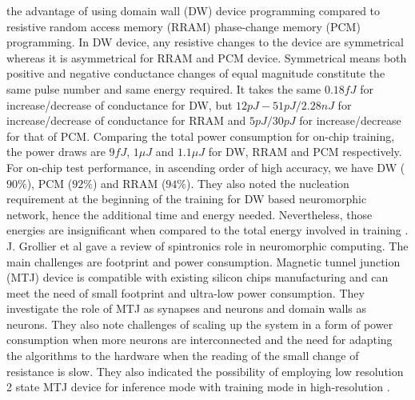 the advantage of using domain wall (DW) device programming compared to resistive random access memory (RRAM) phase-change memory (PCM) programming. In DW device, any resistive changes to the device are symmetrical whereas it is asymmetrical for RRAM and PCM device. Symmetrical means both positive and negative conductance changes of equal magnitude constitute the same pulse number and same energy required. It takes the same $0.18fJ$ for increase/decrease of conductance for DW, but $12pJ-51pJ/2.28nJ$ for increase/decrease of conductance for RRAM and $5pJ/30pJ$ for increase/decrease for that of PCM. Comparing the total power consumption for on-chip training, the power draws are $9fJ$, $1\mu J$ and $1.1\mu J$ for DW, RRAM and PCM respectively. For on-chip test performance, in ascending order of high accuracy, we have DW ($90\%$), PCM ($92\%$) and RRAM ($94\%$). They also noted the nucleation requirement at the beginning of the training for DW based neuromorphic network, hence the additional time and energy needed. Nevertheless, those energies are insignificant when compared to the total energy involved in training \cite{kaushik}. J. Grollier et al gave a review of spintronics role in neuromorphic computing. The main challenges are footprint and power consumption. Magnetic tunnel junction (MTJ) device is compatible with existing silicon chips manufacturing and can meet the need of small footprint and ultra-low power consumption. They investigate the role of MTJ as synapses and neurons and domain walls as neurons. They also note challenges of scaling up the system in a form of power consumption when more neurons are interconnected and the need for adapting the algorithms to the hardware when the reading of the small change of resistance is slow. They also indicated the possibility of employing low resolution 2 state MTJ device for inference mode with training mode in high-resolution \cite{grollier}.

